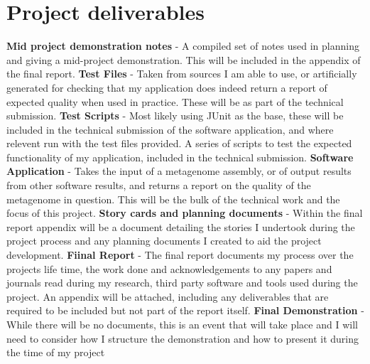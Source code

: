 \documentclass[11pt,fleqn,twoside]{article}
\begin{document}
\section{Project deliverables}
\textbf{Mid project demonstration notes} - A compiled set of notes used in planning and giving a mid-project demonstration. This will be included in the appendix of the final report.
\newline
\noindent
\textbf{Test Files} - Taken from sources I am able to use, or artificially generated for checking that my application does indeed return a report of expected quality when used in practice. These will be as part of the technical submission.
\newline
\noindent
\textbf{Test Scripts} - Most likely using JUnit as the base, these will be included in the technical submission of the software application, and where relevent run with the test files provided. A series of scripts to test the expected functionality of my application, included in the technical submission.
\newline
\noindent
\textbf{Software Application} - Takes the input of a metagenome assembly, or of output results from other software results, and returns a report on the quality of the metagenome in question. This will be the bulk of the technical work and the focus of this project.
\newline
\noindent
\textbf{Story cards and planning documents} - Within the final report appendix will be a document detailing the stories I undertook during the project process and any planning documents I created to aid the project development.
\newline
\noindent
\textbf{Fiinal Report} -  The final report documents my process over the projects life time, the work done and acknowledgements to any papers and journals read during my research, third party software and tools used during the project. An appendix will be attached, including any deliverables that are required to be included but not part of the report itself.
\newline
\noindent
\textbf{Final Demonstration} - While there will be no documents, this is an event that will take place and I will need to consider how I structure the demonstration and how to present it during the time of my project
%
%
%
\end{document}
